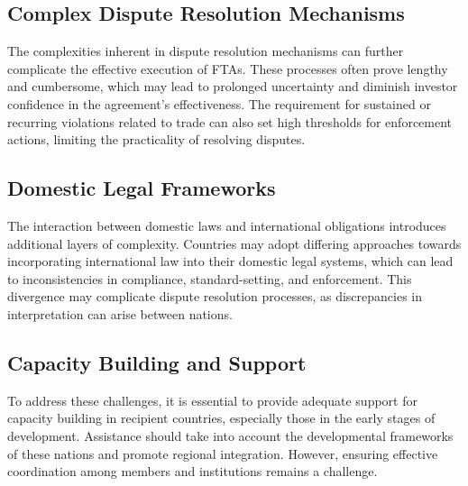 \documentclass[12pt]{article}
\begin{document}
\subsection{Complex Dispute Resolution Mechanisms}
The complexities inherent in dispute resolution mechanisms can further complicate the effective execution of FTAs. These processes often prove lengthy and cumbersome, which may lead to prolonged uncertainty and diminish investor confidence in the agreement's effectiveness. The requirement for sustained or recurring violations related to trade can also set high thresholds for enforcement actions, limiting the practicality of resolving disputes.

\subsection{Domestic Legal Frameworks}
The interaction between domestic laws and international obligations introduces additional layers of complexity. Countries may adopt differing approaches towards incorporating international law into their domestic legal systems, which can lead to inconsistencies in compliance, standard-setting, and enforcement. This divergence may complicate dispute resolution processes, as discrepancies in interpretation can arise between nations.

\subsection{Capacity Building and Support}
To address these challenges, it is essential to provide adequate support for capacity building in recipient countries, especially those in the early stages of development.  Assistance should take into account the developmental frameworks of these nations and promote regional integration. However, ensuring effective coordination among members and institutions remains a challenge.
\end{document}
